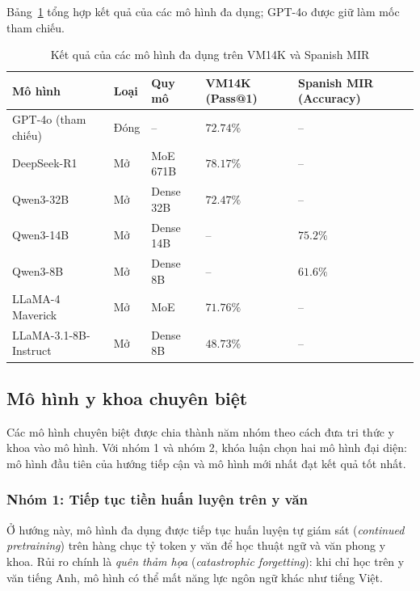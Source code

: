 Bảng~\ref{tab:general_llm_benchmark} tổng hợp kết quả của các mô hình đa dụng; GPT-4o được giữ làm mốc tham chiếu.

\begin{table}[H]
\begin{singlespace}
\centering
\fontsize{8pt}{10pt}\selectfont
\setlength{\tabcolsep}{3.5pt}
\renewcommand{\arraystretch}{1.1}
\begin{tabularx}{\textwidth}{|>{\raggedright\arraybackslash}X|>{\centering\arraybackslash}p{1.8cm}|>{\centering\arraybackslash}p{2.0cm}|>{\centering\arraybackslash}p{2.6cm}|>{\centering\arraybackslash}p{3.0cm}|}
\hline
\textbf{Mô hình} & \textbf{Loại} & \textbf{Quy mô} & \textbf{VM14K (Pass@1)} & \textbf{Spanish MIR (Accuracy)} \\
\hline
GPT-4o \cite{achiam2023gpt4} (tham chiếu) & Đóng & -- & $72.74\%$ & -- \\
\hline
DeepSeek-R1 \cite{deepseek_r1_2025} & Mở & MoE 671B & $\mathbf{78.17\%}$ & -- \\
\hline
Qwen3-32B & Mở & Dense 32B & $72.47\%$ & -- \\
\hline
Qwen3-14B & Mở & Dense 14B & -- & $75.2\%$ \\
\hline
Qwen3-8B & Mở & Dense 8B & -- & $61.6\%$ \\
\hline
LLaMA-4 Maverick & Mở & MoE & $71.76\%$ & -- \\
\hline
LLaMA-3.1-8B-Instruct \cite{llama3_2024} & Mở & Dense 8B & $48.73\%$ & -- \\
\hline
\end{tabularx}
\caption{Kết quả của các mô hình đa dụng trên VM14K và Spanish MIR}
\label{tab:general_llm_benchmark}
\end{singlespace}
\end{table}

\subsection{Mô hình y khoa chuyên biệt}

Các mô hình chuyên biệt được chia thành năm nhóm theo cách đưa tri thức y khoa vào mô hình. Với nhóm 1 và nhóm 2, khóa luận chọn hai mô hình đại diện: mô hình đầu tiên của hướng tiếp cận và mô hình mới nhất đạt kết quả tốt nhất.

\subsubsection{Nhóm 1: Tiếp tục tiền huấn luyện trên y văn}
Ở hướng này, mô hình đa dụng được tiếp tục huấn luyện tự giám sát (\emph{continued pretraining}) trên hàng chục tỷ token y văn để học thuật ngữ và văn phong y khoa. Rủi ro chính là \emph{quên thảm họa} (\emph{catastrophic forgetting}): khi chỉ học trên y văn tiếng Anh, mô hình có thể mất năng lực ngôn ngữ khác như tiếng Việt.

